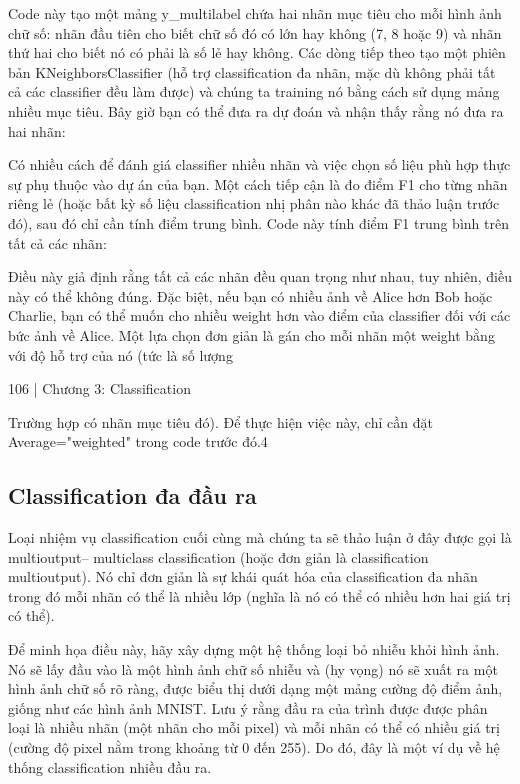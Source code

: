 Code này tạo một mảng y\_multilabel chứa hai nhãn mục tiêu cho mỗi hình ảnh chữ số: nhãn đầu tiên cho biết chữ số đó có lớn hay không (7, 8 hoặc 9) và nhãn thứ hai cho biết nó có phải là số lẻ hay không. Các dòng tiếp theo tạo một phiên bản KNeighborsClassifier (hỗ trợ classification đa nhãn, mặc dù không phải tất cả các classifier đều làm được) và chúng ta training nó bằng cách sử dụng mảng nhiều mục tiêu. Bây giờ bạn có thể đưa ra dự đoán và nhận thấy rằng nó đưa ra hai nhãn:

Có nhiều cách để đánh giá classifier nhiều nhãn và việc chọn số liệu phù hợp thực sự phụ thuộc vào dự án của bạn. Một cách tiếp cận là đo điểm F1 cho từng nhãn riêng lẻ (hoặc bất kỳ số liệu classification nhị phân nào khác đã thảo luận trước đó), sau đó chỉ cần tính điểm trung bình. Code này tính điểm F1 trung bình trên tất cả các nhãn:

Điều này giả định rằng tất cả các nhãn đều quan trọng như nhau, tuy nhiên, điều này có thể không đúng. Đặc biệt, nếu bạn có nhiều ảnh về Alice hơn Bob hoặc Charlie, bạn có thể muốn cho nhiều weight hơn vào điểm của classifier đối với các bức ảnh về Alice. Một lựa chọn đơn giản là gán cho mỗi nhãn một weight bằng với độ hỗ trợ của nó (tức là số lượng

106 | Chương 3: Classification

Trường hợp có nhãn mục tiêu đó). Để thực hiện việc này, chỉ cần đặt Average="weighted" trong code trước đó.4

\subsection{Classification đa đầu ra}

Loại nhiệm vụ classification cuối cùng mà chúng ta sẽ thảo luận ở đây được gọi là multioutput– multiclass classification (hoặc đơn giản là classification multioutput). Nó chỉ đơn giản là sự khái quát hóa của classification đa nhãn trong đó mỗi nhãn có thể là nhiều lớp (nghĩa là nó có thể có nhiều hơn hai giá trị có thể).

Để minh họa điều này, hãy xây dựng một hệ thống loại bỏ nhiễu khỏi hình ảnh. Nó sẽ lấy đầu vào là một hình ảnh chữ số nhiễu và (hy vọng) nó sẽ xuất ra một hình ảnh chữ số rõ ràng, được biểu thị dưới dạng một mảng cường độ điểm ảnh, giống như các hình ảnh MNIST. Lưu ý rằng đầu ra của trình được được phân loại là nhiều nhãn (một nhãn cho mỗi pixel) và mỗi nhãn có thể có nhiều giá trị (cường độ pixel nằm trong khoảng từ 0 đến 255). Do đó, đây là một ví dụ về hệ thống classification nhiều đầu ra.

